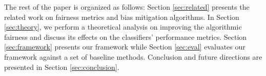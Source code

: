 The rest of the paper is organized as follows: Section \ref{sec:related} presents the related work on fairness metrics and bias mitigation algorithms. In Section \ref{sec:theory}, we perform a theoretical analysis on improving the algorithmic fairness and discuss its effects on the classifiers' performance metrics. Section \ref{sec:framework} presents our framework while Section \ref{sec:eval} evaluates our framework against a set of baseline methods. Conclusion and future directions are presented in Section \ref{sec:conclusion}.











